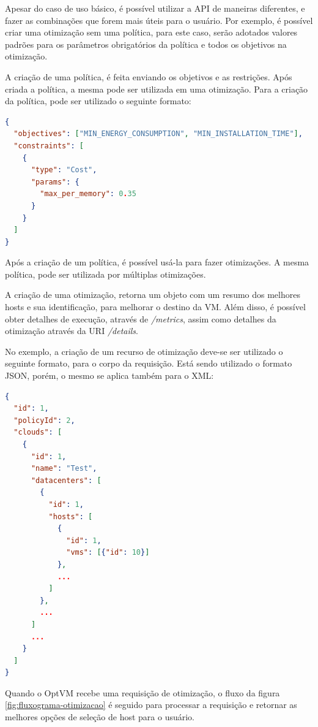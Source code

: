 Apesar do caso de uso básico, é possível utilizar a API de maneiras diferentes,
e fazer as combinações que forem mais úteis para o usuário. Por exemplo, é possível
criar uma otimização sem uma política, para este caso, serão adotados valores
padrões para os parâmetros obrigatórios da política e todos os objetivos na otimização.

A criação de uma política, é feita enviando os objetivos e as restrições.
Após criada a política, a mesma pode ser utilizada em uma otimização. Para a 
criação da política, pode ser utilizado o seguinte formato:

\begin{lstlisting}[language=json,firstnumber=1]
{
  "objectives": ["MIN_ENERGY_CONSUMPTION", "MIN_INSTALLATION_TIME"],
  "constraints": [
    {
      "type": "Cost",
      "params": {
        "max_per_memory": 0.35
      }
    }
  ]
}
\end{lstlisting}

Após a criação de um política, é possível usá-la para fazer otimizações. A mesma
política, pode ser utilizada por múltiplas otimizações.

A criação de uma otimização, retorna um objeto com um resumo dos melhores hosts
e sua identificação, para melhorar o destino da VM.
Além disso, é possível obter detalhes de execução, através de \textit{/metrics}, assim
como detalhes da otimização através da URI \textit{/details}.

No exemplo, a criação de um recurso de otimização deve-se ser utilizado o seguinte formato, 
para o corpo da requisição. Está sendo utilizado o formato JSON, porém, o mesmo se aplica 
também para o XML:



\begin{lstlisting}[language=json,firstnumber=1]
{
  "id": 1,
  "policyId": 2,
  "clouds": [
    {
      "id": 1,
      "name": "Test",
      "datacenters": [
        {
          "id": 1,
          "hosts": [
            {
              "id": 1,
              "vms": [{"id": 10}]
            },
            ...
          ]
        },
        ...
      ]
      ...
    }
  ]
}
\end{lstlisting}

Quando o OptVM recebe uma requisição de otimização, o fluxo da figura \ref{fig:fluxograma-otimizacao}
é seguido para processar a requisição e retornar as melhores opções de seleção de host
para o usuário.

